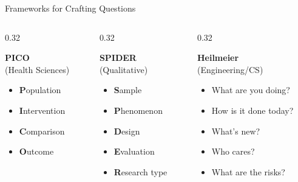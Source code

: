 \documentclass[aspectratio=169]{beamer}
\begin{document}
\begin{frame}{Frameworks for Crafting Questions}
  \begin{columns}[T]
    \begin{column}{0.32\textwidth}
      \begin{block}{\textbf{PICO}\\(Health Sciences)}
        \begin{itemize}
          \item \textbf{P}opulation
          \item \textbf{I}ntervention
          \item \textbf{C}omparison
          \item \textbf{O}utcome
        \end{itemize}
      \end{block}
    \end{column}
    \begin{column}{0.32\textwidth}
      \begin{exampleblock}{\textbf{SPIDER}\\(Qualitative)}
        \begin{itemize}
          \item \textbf{S}ample
          \item \textbf{P}henomenon
          \item \textbf{D}esign
          \item \textbf{E}valuation
          \item \textbf{R}esearch type
        \end{itemize}
      \end{exampleblock}
    \end{column}
    \begin{column}{0.32\textwidth}
      \begin{alertblock}{\textbf{Heilmeier}\\(Engineering/CS)}
        \begin{itemize}
          \item What are you doing?
          \item How is it done today?
          \item What's new?
          \item Who cares?
          \item What are the risks?
        \end{itemize}
      \end{alertblock}
    \end{column}
  \end{columns}
\end{frame}
\end{document}
